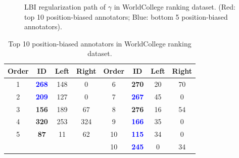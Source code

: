 \documentclass[10pt,journal,cspaper,compsoc]{IEEEtran}
\begin{document}
{\begin{figure}[htb]
 \begin{center}
  \caption{LBI regularization path of $\gamma$ in WorldCollege ranking dataset. (Red: top 10 position-biased annotators; Blue: bottom 5 position-biased annotators).} \label{fig:university_position}
\end{center}
\end{figure}




{\renewcommand\baselinestretch{1.3}\selectfont
\setlength{\belowcaptionskip}{0pt}
\begin{table}[h]\caption{\label{tab:universityposition} Top 10 position-biased annotators in WorldCollege ranking dataset.}
\tiny
\centering
\begin{lrbox}{\tablebox}
\begin{tabular}{||c|c|c|c||c|c|c|c||}
  \hline  \textbf{Order} &\textbf{ID}   &\textbf{Left}  &\textbf{Right} & \textbf{Order} & \textbf{ID}   &\textbf{Left}  &\textbf{Right} \\
 \hline
 \hline  1 & \textcolor{blue}{\textbf{268}} &148	&0 & 6 & \textbf{270}	&20	&70 \\
 \hline  2 & \textcolor{blue}{\textbf{209}}	&127	&0 & 7 & \textcolor{blue}{\textbf{267}}	&45	&0 \\
 \hline 3 & \textbf{156}	&189	&67 & 8 & \textbf{276}	&16	&54 \\
 \hline 4  & \textbf{320}	&253	&324  & 9 & \textcolor{blue}{\textbf{166}}	&35	&0 \\
 \hline 5 & \textbf{87}	&11	&62 & 10 & \textcolor{blue}{\textbf{115}}	&34	&0 \\
 \hline   &  	& 	&  & 10 & \textcolor{blue}{\textbf{245}}	&0	&34 \\




\end{tabular}
\end{lrbox}
\end{table}}}
\end{document}
